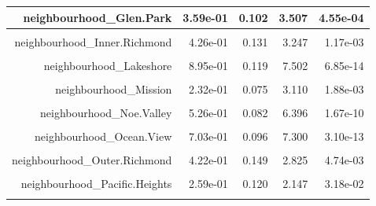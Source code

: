 \documentclass[justified, 11pt]{scrartcl}\usepackage[]{graphicx}\usepackage[]{xcolor}
\newenvironment{knitrout}{}{} %
\begin{document}
\begin{knitrout}
\begin{table}
\begin{tabular}{r|r|r|r|r}
\hline
neighbourhood\_Glen.Park & 3.59e-01 & 0.102 & 3.507 & 4.55e-04\\
\hline
\cellcolor{gray!6}{neighbourhood\_Haight.Ashbury} & \cellcolor{gray!6}{4.48e-01} & \cellcolor{gray!6}{0.102} & \cellcolor{gray!6}{4.391} & \cellcolor{gray!6}{1.14e-05}\\
\hline
neighbourhood\_Inner.Richmond & 4.26e-01 & 0.131 & 3.247 & 1.17e-03\\
\hline
\cellcolor{gray!6}{neighbourhood\_Inner.Sunset} & \cellcolor{gray!6}{5.98e-01} & \cellcolor{gray!6}{0.115} & \cellcolor{gray!6}{5.178} & \cellcolor{gray!6}{2.29e-07}\\
\hline
neighbourhood\_Lakeshore & 8.95e-01 & 0.119 & 7.502 & 6.85e-14\\
\hline
\cellcolor{gray!6}{neighbourhood\_Marina} & \cellcolor{gray!6}{1.23e-02} & \cellcolor{gray!6}{0.129} & \cellcolor{gray!6}{0.095} & \cellcolor{gray!6}{9.24e-01}\\
\hline
neighbourhood\_Mission & 2.32e-01 & 0.075 & 3.110 & 1.88e-03\\
\hline
\cellcolor{gray!6}{neighbourhood\_Nob.Hill} & \cellcolor{gray!6}{1.37e-01} & \cellcolor{gray!6}{0.107} & \cellcolor{gray!6}{1.287} & \cellcolor{gray!6}{1.98e-01}\\
\hline
neighbourhood\_Noe.Valley & 5.26e-01 & 0.082 & 6.396 & 1.67e-10\\
\hline
\cellcolor{gray!6}{neighbourhood\_North.Beach} & \cellcolor{gray!6}{1.34e-02} & \cellcolor{gray!6}{0.121} & \cellcolor{gray!6}{0.111} & \cellcolor{gray!6}{9.12e-01}\\
\hline
neighbourhood\_Ocean.View & 7.03e-01 & 0.096 & 7.300 & 3.10e-13\\
\hline
\cellcolor{gray!6}{neighbourhood\_Outer.Mission} & \cellcolor{gray!6}{5.47e-01} & \cellcolor{gray!6}{0.089} & \cellcolor{gray!6}{6.180} & \cellcolor{gray!6}{6.67e-10}\\
\hline
neighbourhood\_Outer.Richmond & 4.22e-01 & 0.149 & 2.825 & 4.74e-03\\
\hline
\cellcolor{gray!6}{neighbourhood\_Outer.Sunset} & \cellcolor{gray!6}{5.47e-01} & \cellcolor{gray!6}{0.132} & \cellcolor{gray!6}{4.152} & \cellcolor{gray!6}{3.33e-05}\\
\hline
neighbourhood\_Pacific.Heights & 2.59e-01 & 0.120 & 2.147 & 3.18e-02\\
\hline
\cellcolor{gray!6}{neighbourhood\_Parkside} & \cellcolor{gray!6}{5.72e-01} & \cellcolor{gray!6}{0.124} & \cellcolor{gray!6}{4.614} & \cellcolor{gray!6}{4.00e-06}\\

\end{tabular}
\end{table}
\end{knitrout}
\end{document}
